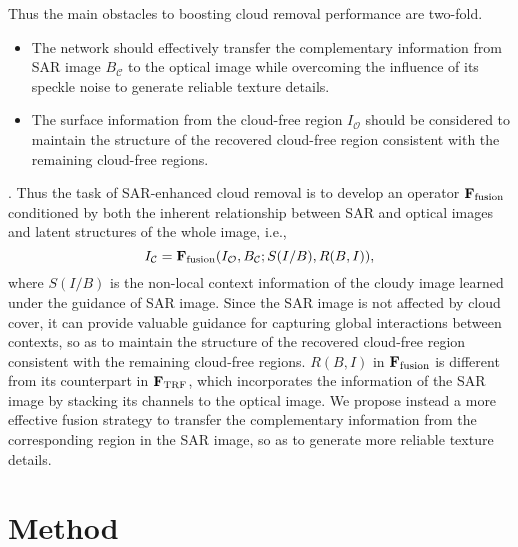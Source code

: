 \documentclass[a4paper,fleqn]{cas-dc}
\newcommand{\ie}[1]{{i.e.}}
\begin{document}
Thus the main obstacles to boosting cloud removal performance are two-fold. 
\begin{itemize}
\item The network should effectively transfer the complementary information from SAR image $B_{\mathcal{C}}$ to the optical image while overcoming the influence of its speckle noise to generate reliable texture details.
	\item The surface information from the cloud-free region $I_\mathcal{O}$ should be considered to maintain the structure of the recovered cloud-free region consistent with the remaining cloud-free regions.
\end{itemize} 
. Thus the task of SAR-enhanced cloud removal is to develop an operator $\mathbf{F}_\textnormal{fusion}$ conditioned by both the inherent relationship between SAR and optical images and latent structures of the whole image, \ie{},
\begin{equation}
	\setlength{\abovedisplayskip}{4pt}	
	\setlength{\belowdisplayskip}{4pt}
	I_{\mathcal{C}} = \mathbf{F}_\textnormal{fusion}(I_\mathcal{O}, B_\mathcal{C}; S(I/B), R(B,I)),
\end{equation}
where $S(I/B)$ is the non-local context information of the cloudy image learned under the guidance of SAR image. Since the SAR image is not affected by cloud cover, it can provide valuable guidance for capturing global interactions between contexts, so as to maintain the structure of the recovered cloud-free region consistent with the remaining cloud-free regions. $R(B,I)$ in $\mathbf{F}_\textnormal{fusion}$ is different from its counterpart in $\mathbf{F}_\textnormal{TRF}$, which incorporates the information of the SAR image by stacking its channels to the optical image. We propose instead a more effective fusion strategy to transfer the complementary information from the corresponding region in the SAR image, so as to generate more reliable texture details.



\section{Method}
\end{document}
